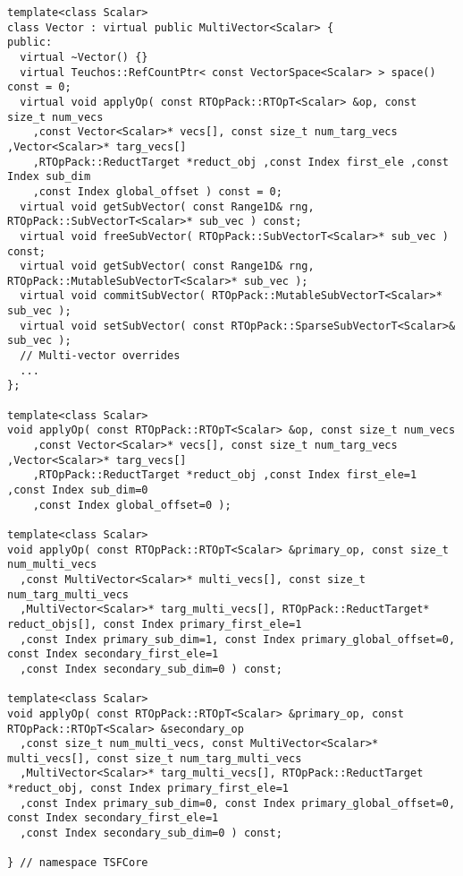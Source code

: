 {\begin{verbatim}
template<class Scalar>
class Vector : virtual public MultiVector<Scalar> {
public:
  virtual ~Vector() {}
  virtual Teuchos::RefCountPtr< const VectorSpace<Scalar> > space() const = 0;
  virtual void applyOp( const RTOpPack::RTOpT<Scalar> &op, const size_t num_vecs
    ,const Vector<Scalar>* vecs[], const size_t num_targ_vecs ,Vector<Scalar>* targ_vecs[]
    ,RTOpPack::ReductTarget *reduct_obj ,const Index first_ele ,const Index sub_dim
    ,const Index global_offset ) const = 0;
  virtual void getSubVector( const Range1D& rng, RTOpPack::SubVectorT<Scalar>* sub_vec ) const;
  virtual void freeSubVector( RTOpPack::SubVectorT<Scalar>* sub_vec ) const;
  virtual void getSubVector( const Range1D& rng, RTOpPack::MutableSubVectorT<Scalar>* sub_vec );
  virtual void commitSubVector( RTOpPack::MutableSubVectorT<Scalar>* sub_vec );
  virtual void setSubVector( const RTOpPack::SparseSubVectorT<Scalar>& sub_vec );
  // Multi-vector overrides
  ...
};

template<class Scalar>
void applyOp( const RTOpPack::RTOpT<Scalar> &op, const size_t num_vecs
    ,const Vector<Scalar>* vecs[], const size_t num_targ_vecs ,Vector<Scalar>* targ_vecs[]
    ,RTOpPack::ReductTarget *reduct_obj ,const Index first_ele=1 ,const Index sub_dim=0
    ,const Index global_offset=0 );

template<class Scalar>
void applyOp( const RTOpPack::RTOpT<Scalar> &primary_op, const size_t num_multi_vecs
  ,const MultiVector<Scalar>* multi_vecs[], const size_t num_targ_multi_vecs
  ,MultiVector<Scalar>* targ_multi_vecs[], RTOpPack::ReductTarget* reduct_objs[], const Index primary_first_ele=1
  ,const Index primary_sub_dim=1, const Index primary_global_offset=0, const Index secondary_first_ele=1
  ,const Index secondary_sub_dim=0 ) const;

template<class Scalar>
void applyOp( const RTOpPack::RTOpT<Scalar> &primary_op, const RTOpPack::RTOpT<Scalar> &secondary_op
  ,const size_t num_multi_vecs, const MultiVector<Scalar>* multi_vecs[], const size_t num_targ_multi_vecs
  ,MultiVector<Scalar>* targ_multi_vecs[], RTOpPack::ReductTarget *reduct_obj, const Index primary_first_ele=1
  ,const Index primary_sub_dim=0, const Index primary_global_offset=0, const Index secondary_first_ele=1
  ,const Index secondary_sub_dim=0 ) const;

} // namespace TSFCore
\end{verbatim}}

